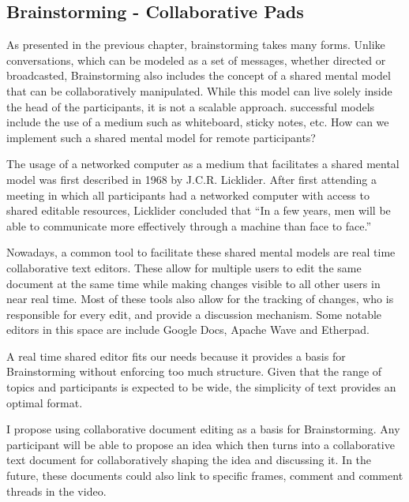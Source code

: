 \subsection{Brainstorming - Collaborative Pads}

As presented in the previous chapter, brainstorming takes many forms. Unlike conversations, which can be modeled as a set of messages, whether directed or broadcasted, Brainstorming also includes the concept of a shared mental model that can be collaboratively manipulated. While this model can live solely inside the head of the participants, it is not a scalable approach. successful models include the use of a medium such as whiteboard, sticky notes, etc. How can we implement such a shared mental model for remote participants?

The usage of a networked computer as a medium that facilitates a shared mental model was first described in 1968 by J.C.R. Licklider. After first attending a meeting in which all participants had a networked computer with access to shared editable resources, Licklider concluded that ``In a few years, men will be able to communicate more effectively through a machine than face to face.''\cite{licklider1968computer}

Nowadays, a common tool to facilitate these shared mental models are real time collaborative text editors. These allow for multiple users to edit the same document at the same time while making changes visible to all other users in near real time. Most of these tools also allow for the tracking of changes, who is responsible for every edit, and provide a discussion mechanism. Some notable editors in this space are include Google Docs\cite{gdocs}, Apache Wave\cite{wave} and Etherpad\cite{etherpad}. 

A real time shared editor fits our needs because it provides a basis for Brainstorming without enforcing too much structure. Given that the range of topics and participants is expected to be wide, the simplicity of text provides an optimal format. 

I propose using collaborative document editing as a basis for Brainstorming. Any participant will be able to propose an idea which then turns into a collaborative text document for collaboratively shaping the idea and discussing it. In the future, these documents could also link to specific frames, comment and comment threads in the video. 